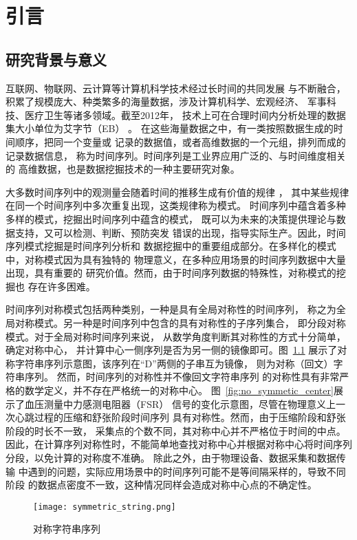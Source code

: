 
\chapter{引言}

\section{研究背景与意义}
互联网、物联网、云计算等计算机科学技术经过长时间的共同发展
与不断融合，积累了规模庞大、种类繁多的海量数据，涉及计算机科学、宏观经济、
军事科技、医疗卫生等诸多领域\cite{2022968}。截至2012年，
技术上可在合理时间内分析处理的数据集大小单位为艾字节（EB）
\cite{DBLP:journals/jbd/TsaiLCV15}。
在这些海量数据之中，有一类按照数据生成的时间顺序，把同一个变量或
记录的数据值，或者高维数据的一个元组，排列而成的记录数据信息，
称为时间序列。时间序列是工业界应用广泛的、与时间维度相关的
高维数据，也是数据挖掘技术的一种主要研究对象。

大多数时间序列中的观测量会随着时间的推移生成有价值的规律
\cite{DBLP:conf/sdm/MueenKZCW09}，
其中某些规律在同一个时间序列中多次重复出现，这类规律称为模式。
时间序列中蕴含着多种多样的模式，挖掘出时间序列中蕴含的模式，
既可以为未来的决策提供理论与数据支持，又可以检测、判断、预防突发
错误的出现，指导实际生产。因此，时间序列模式挖掘是时间序列分析和
数据挖掘中的重要组成部分。在多样化的模式中，对称模式因为具有独特的
物理意义，在多种应用场景的时间序列数据中大量出现，具有重要的
研究价值\cite{2022968}。然而，由于时间序列数据的特殊性，对称模式的挖掘也
存在许多困难。

时间序列对称模式包括两种类别，一种是具有全局对称性的时间序列，
称之为全局对称模式。另一种是时间序列中包含的具有对称性的子序列集合，
即分段对称模式。对于全局对称时间序列来说，
从数学角度判断其对称性的方式十分简单，确定对称中心，
并计算中心一侧序列是否为另一侧的镜像即可。图~\ref{fig:symmetric_string}
展示了对称字符串序列示意图，该序列在“D”两侧的子串互为镜像，
则为对称（回文）字符串序列\cite{DBLP:journals/corr/abs-2003-08211}。
然而，时间序列的对称性并不像回文字符串序列
的对称性具有非常严格的数学定义，并不存在严格统一的对称中心。
图~\ref{fig:no_symmetic_center}展示了血压测量中力感测电阻器（FSR）
信号的变化示意图，尽管在物理意义上一次心跳过程的压缩和舒张阶段时间序列
具有对称性。然而，由于压缩阶段和舒张阶段的时长不一致，
采集点的个数不同，其对称中心并不严格位于时间的中点。
因此，在计算序列对称性时，不能简单地查找对称中心并根据对称中心将时间序列
分段，以免计算的对称度不准确\cite{DBLP:journals/csda/DaiNG18}。
除此之外，由于物理设备、数据采集和数据传输
中遇到的问题，实际应用场景中的时间序列可能不是等间隔采样的，导致不同阶段
的数据点密度不一致，这种情况同样会造成对称中心点的不确定性。
\begin{figure}
  \centering
  \texttt{[image: symmetric\_string.png]}
  \caption{对称字符串序列}
  \label{fig:symmetric_string}
\end{figure}

